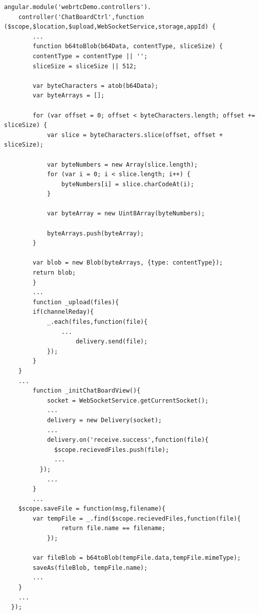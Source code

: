 \begin{lstlisting}[caption={Files Sharing in ChatBoardCtrl.js},label={code:chatboard_ctrl}]
angular.module('webrtcDemo.controllers').
	controller('ChatBoardCtrl',function ($scope,$location,$upload,WebSocketService,storage,appId) {
		...
		function b64toBlob(b64Data, contentType, sliceSize) {
	    contentType = contentType || '';
	    sliceSize = sliceSize || 512;

	    var byteCharacters = atob(b64Data);
	    var byteArrays = [];

	    for (var offset = 0; offset < byteCharacters.length; offset += sliceSize) {
	        var slice = byteCharacters.slice(offset, offset + sliceSize);

	        var byteNumbers = new Array(slice.length);
	        for (var i = 0; i < slice.length; i++) {
	            byteNumbers[i] = slice.charCodeAt(i);
	        }

	        var byteArray = new Uint8Array(byteNumbers);

	        byteArrays.push(byteArray);
	    }

	    var blob = new Blob(byteArrays, {type: contentType});
	    return blob;
		}
        ...
		function _upload(files){
  		if(channelReday){
  			_.each(files,function(file){
  				...
					delivery.send(file);
  			});
  		}
  	}
  	...
		function _initChatBoardView(){
			socket = WebSocketService.getCurrentSocket();
			...
			delivery = new Delivery(socket);
			...
			delivery.on('receive.success',function(file){
	          $scope.recievedFiles.push(file);
	          ...	    
	      });
			...
		}
		...
  	$scope.saveFile = function(msg,filename){
  		var tempFile = _.find($scope.recievedFiles,function(file){
				return file.name == filename;
			});

  		var fileBlob = b64toBlob(tempFile.data,tempFile.mimeType);
  		saveAs(fileBlob, tempFile.name);
  		...
  	}
  	...
  });
\end{lstlisting}


